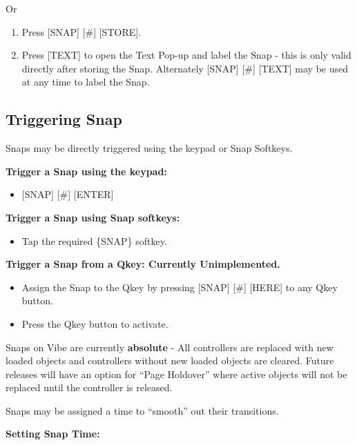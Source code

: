 \documentclass[
]{article}
\providecommand{\tightlist}{%
  \setlength{\itemsep}{0pt}\setlength{\parskip}{0pt}}
\begin{document}
Or

\begin{enumerate}
\def\labelenumi{\arabic{enumi}.}
\setcounter{enumi}{1}
\item
  Press {[}SNAP{]} {[}\#{]} {[}STORE{]}.
\item
  Press {[}TEXT{]} to open the Text Pop-up and label the Snap - this is only valid directly after storing the Snap. Alternately {[}SNAP{]} {[}\#{]} {[}TEXT{]} may be used at any time to label the Snap.
\end{enumerate}

\hypertarget{triggering-snap}{%
\subsection{Triggering Snap}\label{triggering-snap}}

Snaps may be directly triggered using the keypad or Snap Softkeys.

\textbf{Trigger a Snap using the keypad:}

\begin{itemize}
\tightlist
\item
  {[}SNAP{]} {[}\#{]} {[}ENTER{]}
\end{itemize}

\textbf{Trigger a Snap using Snap softkeys:}

\begin{itemize}
\tightlist
\item
  Tap the required \{SNAP\} softkey.
\end{itemize}

{\textbf{Trigger a Snap from a Qkey: Currently Unimplemented.}}

\begin{itemize}
\item
  {Assign the Snap to the Qkey by pressing {[}SNAP{]} {[}\#{]} {[}HERE{]} to any Qkey button.}
\item
  {Press the Qkey button to activate. }
\end{itemize}

Snaps on Vibe are currently \textbf{absolute} - All controllers are replaced with new loaded objects and controllers without new loaded objects are cleared. {Future releases will have an option for ``Page Holdover'' where active objects will not be replaced until the controller is released.}

Snaps may be assigned a time to ``smooth'' out their transitions.

\textbf{Setting Snap Time:}
\end{document}
